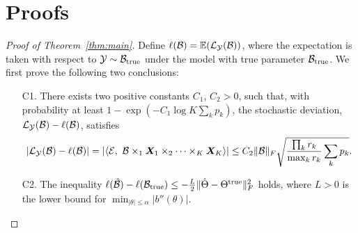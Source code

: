 \documentclass[12pt]{article}
\theoremstyle{plain}
\theoremstyle{definition}
\begin{document}
\section{Proofs}\label{sec:appedix}
\begin{proof}[Proof of Theorem~\ref{thm:main}]
Define $\ell(\mathcal{B})=\mathbb{E}(\mathcal{L}_{\mathcal{Y}}(\mathcal{B}))$, where the expectation is taken with respect to $\mathcal{Y}\sim \mathcal{B}_{\text{true}}$ under the model with true parameter $\mathcal{B}_{\text{true}}$. We first prove the following two conclusions:
\begin{enumerate}
\item[C1.] There exists two positive constants $C_1$, $C_2>0$, such that, with probability at least $1-\exp(-C_1\log K\sum_k p_k)$, the stochastic deviation, $\mathcal{L}_{\mathcal{Y}}(\mathcal{B})-\ell(\mathcal{B})$, satisfies
\[
|\tL_{\tY}(\tB)-\ell(\tB)|=|\langle \tE,\ \tB\times_1\mX_1\times_2\cdots\times_K \mX_K\rangle| \leq C_2\FnormSize{}{\tB} \sqrt{{\prod_k r_k \over \max_k r_k} \sum_k p_k}.
\]
\item[C2.] The inequality $\ell(\hat {\mathcal{B}}) - \ell(\mathcal{B}_{\text{true}}) \leq  -{L\over 2}\lVert\hat \Theta-\Theta^{\text{true}}\rVert_F^2$ holds, where $L>0$ is the lower bound for $\min_{|\theta|\leq \alpha}|b''(\theta)|$. 
\end{enumerate}


\end{proof}
\end{document}
